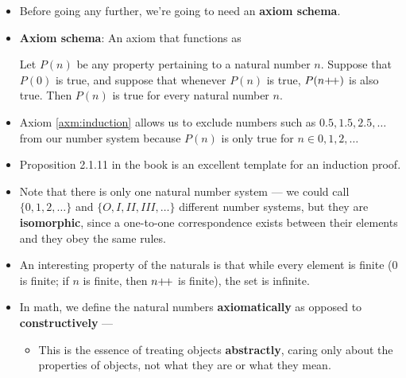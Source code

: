 \documentclass[../main.tex]{subfiles}
\begin{document}
\begin{itemize}
\begin{prop}
        6 is not equal to 2.
        \begin{proof}
            Suppose $6=2$. Then $5\pplus=1\pplus$, so by Axiom \ref{axm:successorDistinctness}, $5=1$. Then $4\pplus=0\pplus$, so by Axiom \ref{axm:successorDistinctness}, $4=0$, which contradicts our proof that $4\neq 0$.
        \end{proof}
    \end{prop}
    \item {}Before going any further, we're going to need an \textbf{axiom schema}.
    \item \textbf{Axiom schema}: An axiom that functions as 
    \begin{axm}\label{axm:induction}
        Let $P(n)$ be any property pertaining to a natural number $n$. Suppose that $P(0)$ is true, and suppose that whenever $P(n)$ is true, $P(n{+\!+})$ is also true. Then $P(n)$ is true for every natural number $n$.
    \end{axm}
    \item Axiom \ref{axm:induction} allows us to exclude numbers such as $0.5,1.5,2.5,\dots$ from our number system because $P(n)$ is only true for $n\in 0,1,2,\dots$
    \item Proposition 2.1.11 in the book is an excellent template for an induction proof.
    \item Note that there is only one natural number system --- we could call $\{0,1,2,\dots\}$ and $\{O,I,II,III,\dots\}$ different number systems, but they are \textbf{isomorphic}, since a one-to-one correspondence exists between their elements and they obey the same rules.
    \item An interesting property of the naturals is that while every element is finite (0 is finite; if $n$ is finite, then $n{+\!+}$ is finite), the set is infinite.
    \item In math, we define the natural numbers \textbf{axiomatically} as opposed to \textbf{constructively} --- 
    \begin{itemize}
        \item This is the essence of treating objects \textbf{abstractly}, caring only about the properties of objects, not what they are or what they mean.

\end{itemize}
\end{itemize}
\end{document}
